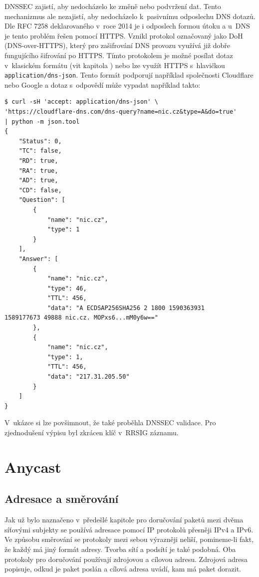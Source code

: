 \documentclass[thesis=M,czech]{src/FITthesis}[2019/12/23]
\begin{document}
DNSSEC zajistí, aby nedocházelo ke změně nebo podvržení dat. Tento mechanizmus ale nezajistí, aby nedocházelo k~pasivnímu odposlechu DNS dotazů. Dle RFC 7258 deklarovaného v~roce 2014 je i odposlech formou útoku a u~DNS je tento problém řešen pomocí HTTPS. Vznikl protokol označovaný jako DoH (DNS-over-HTTPS), který pro zašifrování DNS provozu využívá již dobře fungujícího šifrování po HTTPS. Tímto protokolem je možné posílat dotaz v~klasickém formátu (vit kapitola \textit{}) nebo lze využít HTTPS s~hlavičkou \texttt{application/dns-json}. Tento formát podporují například společnosti Cloudflare nebo Google a dotaz  s~odpovědí může vypadat například takto:  
\begin{verbatim}
$ curl -sH 'accept: application/dns-json' \
'https://cloudflare-dns.com/dns-query?name=nic.cz&type=A&do=true' 
| python -m json.tool
{
    "Status": 0,
    "TC": false,
    "RD": true,
    "RA": true,
    "AD": true,
    "CD": false,
    "Question": [
        {
            "name": "nic.cz",
            "type": 1
        }
    ],
    "Answer": [
        {
            "name": "nic.cz",
            "type": 46,
            "TTL": 456,
            "data": "A ECDSAP256SHA256 2 1800 1590363931
1589177673 49888 nic.cz. MOPxs6...mM0y6w=="
        },
        {
            "name": "nic.cz",
            "type": 1,
            "TTL": 456,
            "data": "217.31.205.50"
        }
    ]
}
\end{verbatim}
V~ukázce si lze povšimnout, že také proběhla DNSSEC validace. Pro zjednodušení výpisu byl zkrácen klíč v~RRSIG záznamu. \cite{root-doh, cznic-odvr}





\chapter{Anycast}

\section{Adresace a směrování}
Jak už bylo naznačeno v~předešlé kapitole pro doručování paketů mezi dvěma síťovými subjekty se používá adresace pomocí IP protokolů přesněji IPv4 a IPv6. Ve způsobu směrování se protokoly mezi sebou výrazněji neliší, \linebreak pomineme-li fakt, že každý má jiný formát adresy. Tvorba sítí a podsítí je také podobná. Oba protokoly pro doručování používají zdrojovou a cílovou adresu. Zdrojová adresa popisuje, odkud je paket poslán a cílová adresa uvádí, kam má paket dorazit. 
\end{document}
